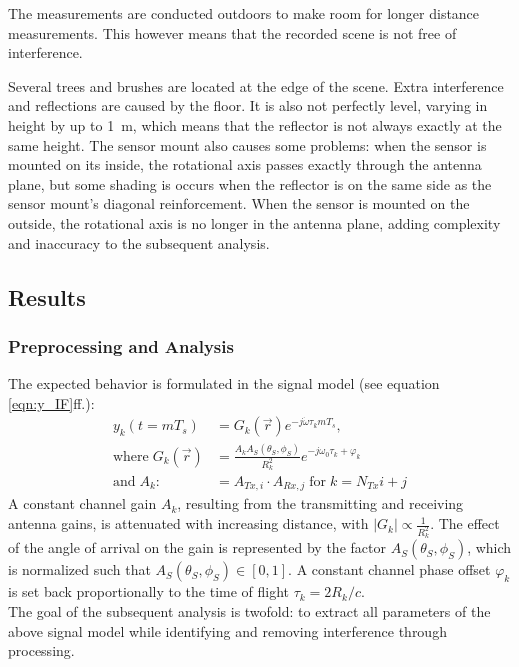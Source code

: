 The measurements are conducted outdoors to make room for longer distance measurements.
This however means that the recorded scene is not free of interference.

Several trees and brushes are located at the edge of the scene.
Extra interference and reflections are caused by the floor.
It is also not perfectly level, varying in height by up to \SI{1}{\meter},
which means that the reflector is not always exactly at the same height.
The sensor mount also causes some problems:
when the sensor is mounted on its inside,
the rotational axis passes exactly through the antenna plane,
but some shading is occurs when the reflector is on the same side as the sensor mount's diagonal reinforcement.
When the sensor is mounted on the outside,
the rotational axis is no longer in the antenna plane,
adding complexity and inaccuracy to the subsequent analysis.

\subsection{Results}
\subsubsection*{Preprocessing and Analysis}

The expected behavior is formulated in the signal model (see equation \ref{eqn:y_IF}ff.):
\begin{align}
    y_k(t=mT_s)                & =                  G_k(\vec r) e^{-j\dot\omega\tau_k mT_s},                 \\
    \text{where}\; G_k(\vec r) & = \frac{A_kA_S(\theta_S,\phi_S)}{R_{k}^2}  e^{-j\omega_0\tau_k + \varphi_k} \\
    \text{and}\;A_k :          & = A_{Tx,i} \cdot A_{Rx,j} \;\text{for}\;k=N_{Tx}i+j
\end{align}
A constant channel gain $A_k$, resulting from the transmitting and receiving antenna gains,
is attenuated with increasing distance, with $|G_k| \propto \frac{1}{R_{k}^2}$.
The effect of the angle of arrival on the gain is represented by the factor $A_S(\theta_S,\phi_S)$,
which is normalized such that $A_S(\theta_S,\phi_S) \in [0,1]$.
A constant channel phase offset $\varphi_k$ is set back proportionally to the time of flight $\tau_k = 2R_k/c$. \\

The goal of the subsequent analysis is twofold:
to extract all parameters of the above signal model while identifying and removing interference through processing.

